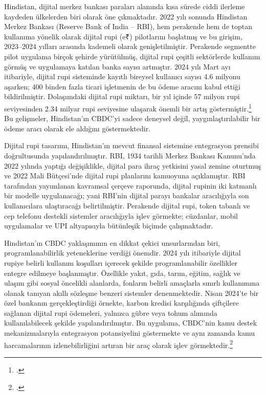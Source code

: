 \documentclass[a4paper,12pt]{article}
\begin{document}
Hindistan, dijital merkez bankası paraları alanında kısa sürede ciddi ilerleme kaydeden ülkelerden biri olarak öne çıkmaktadır. 2022 yılı sonunda Hindistan Merkez Bankası (Reserve Bank of India – RBI), hem perakende hem de toptan kullanıma yönelik olarak dijital rupi (e₹) pilotlarını başlatmış ve bu girişim, 2023–2024 yılları arasında kademeli olarak genişletilmiştir. Perakende segmentte pilot uygulama birçok şehirde yürütülmüş, dijital rupi çeşitli sektörlerde kullanım görmüş ve uygulamaya katılan banka sayısı artmıştır. 2024 yılı Mart ayı itibariyle, dijital rupi sisteminde kayıtlı bireysel kullanıcı sayısı 4.6 milyonu aşarken; 400 binden fazla ticari işletmenin de bu ödeme aracını kabul ettiği bildirilmiştir. Dolaşımdaki dijital rupi miktarı, bir yıl içinde 57 milyon rupi seviyesinden 2.34 milyar rupi seviyesine ulaşarak önemli bir artış göstermiştir.\footcite{rbi2023concept} Bu gelişmeler, Hindistan'ın CBDC’yi sadece deneysel değil, yaygınlaştırılabilir bir ödeme aracı olarak ele aldığını göstermektedir.

Dijital rupi tasarımı, Hindistan’ın mevcut finansal sistemine entegrasyon prensibi doğrultusunda yapılandırılmıştır. RBI, 1934 tarihli Merkez Bankası Kanunu'nda 2022 yılında yaptığı değişiklikle, dijital para ihraç yetkisini yasal zemine oturtmuş ve 2022 Mali Bütçesi’nde dijital rupi planlarını kamuoyuna açıklamıştır. RBI tarafından yayımlanan kavramsal çerçeve raporunda, dijital rupinin iki katmanlı bir modelle uygulanacağı; yani RBI’nin dijital parayı bankalar aracılığıyla son kullanıcılara ulaştıracağı belirtilmiştir. Perakende dijital rupi, token tabanlı ve cep telefonu destekli sistemler aracılığıyla işlev görmekte; cüzdanlar, mobil uygulamalar ve UPI altyapısıyla bütünleşik biçimde çalışmaktadır.

Hindistan’ın CBDC yaklaşımının en dikkat çekici unsurlarından biri, programlanabilirlik yeteneklerine verdiği önemdir. 2024 yılı itibariyle dijital rupiye belirli kullanım koşulları içerecek şekilde programlanabilir özellikler entegre edilmeye başlanmıştır. Özellikle yakıt, gıda, tarım, eğitim, sağlık ve ulaşım gibi sosyal öncelikli alanlarda, fonların belirli amaçlarla sınırlı kullanımına olanak tanıyan akıllı sözleşme benzeri sistemler denenmektedir. Nisan 2024’te bir özel bankanın gerçekleştirdiği örnekte, karbon kredisi karşılığında çiftçilere sağlanan dijital rupi ödemeleri, yalnızca gübre veya tohum alımında kullanılabilecek şekilde yapılandırılmıştır. Bu uygulama, CBDC’nin kamu destek mekanizmalarıyla entegrasyon potansiyelini göstermekte ve aynı zamanda kamu harcamalarının izlenebilirliğini artıran bir araç olarak işlev görmektedir.\footcite{bqprime2024carbon}
\end{document}
